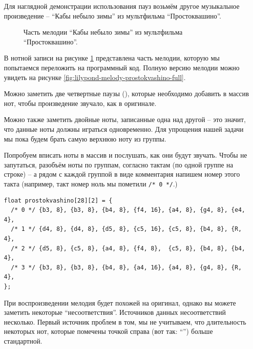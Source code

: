 \documentclass[a4paper,twoside]{book}
\begin{document}
Для наглядной демонстрации использования пауз возьмём другое музыкальное
произведение -- ``Кабы небыло зимы'' из мультфильма ``Простоквашино''.

\begin{figure}[ht]
  \caption{Часть мелодии ``Кабы небыло зимы'' из мультфильма ``Простоквашино''.}
  \label{fig:lilypond-melody-prostokvashino}
\end{figure}

В нотной записи на рисунке \ref{fig:lilypond-melody-prostokvashino} представлена
часть мелодии, которую мы попытаемся переложить на программный код. Полную
версию мелодии можно увидеть на рисунке
\ref{fig:lilypond-melody-prostokvashino-full}.

Можно заметить две четвертные паузы (\crotchetRest), которые необходимо добавить
в массив нот, чтобы произведение звучало, как в оригинале.

Можно также заметить двойные ноты, записанные одна над другой -- это значит, что
данные ноты должны играться одновременно. Для упрощения нашей задачи мы пока
будем брать самую верхнюю ноту из группы.

Попробуем вписать ноты в массив и послушать, как они будут звучать. Чтобы не
запутаться, разобъём ноты по группам, согласно тактам (по одной группе на
строке) -- а рядом с каждой группой в виде комментария напишем номер этого такта
(например, такт номер ноль мы пометили \texttt{/* 0 */}.)

\begin{verbatim}
float prostokvashino[28][2] = {
  /* 0 */ {b3, 8}, {b3, 8}, {b4, 8}, {f4, 16}, {a4, 8}, {g4, 8}, {e4, 4},
  /* 1 */ {d4, 8}, {d4, 8}, {d5, 8}, {c5, 16}, {c5, 8}, {b4, 8}, {R,  4},
  /* 2 */ {d5, 8}, {c5, 8}, {a4, 8}, {f4, 8},  {c5, 8}, {b4, 8}, {b4, 4},
  /* 3 */ {b3, 8}, {b3, 8}, {b4, 8}, {a4, 16}, {a4, 8}, {g4, 8}, {R,  4},
};
\end{verbatim}

При воспроизведении мелодия будет похожей на оригинал, однако вы можете заметить
некоторые ``несоответствия''. Источников данных несоответствий несколько. Первый
источник проблем в том, мы не учитываем, что длительность некоторых нот, которые
помечены точкой справа (вот так: ``\eighthNoteDotted'') больше стандартной.
\end{document}
